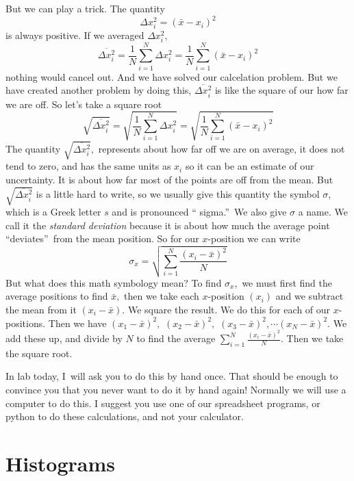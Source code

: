 \documentclass[twoside,11pt,ShortChapTitles]{BYUTextbook}
\begin{document}
But we can play a trick. The quantity
\[
\Delta x_{i}^{2}=\left( \bar{x}-x_{i}\right) ^{2}
\]%
is always positive. If we averaged $\Delta x_{i}^{2},$
\[
\overline{\Delta x_{i}^{2}}=\frac{1}{N}\sum_{i=1}^{N}\Delta x_{i}^{2}=\frac{1%
}{N}\sum_{i=1}^{N}\left( \bar{x}-x_{i}\right) ^{2}
\]%
nothing would cancel out. And we have solved our calcelation problem. But we
have created another problem by doing this, $\overline{\Delta x_{i}^{2}}$ is
like the square of our how far we are off. So let's take a square root%
\[
\sqrt{\overline{\Delta x_{i}^{2}}}=\sqrt{\frac{1}{N}\sum_{i=1}^{N}\Delta
x_{i}^{2}}=\sqrt{\frac{1}{N}\sum_{i=1}^{N}\left( \bar{x}-x_{i}\right) ^{2}}
\]%
The quantity $\sqrt{\overline{\Delta x_{i}^{2}}},$ represents about how far
off we are on average, it does not tend to zero, and has the same units as $%
x_{i}$ so it can be an estimate of our uncertainty. It is about how far most
of the points are off from the mean. But $\sqrt{\overline{\Delta x_{i}^{2}}}$
is a little hard to write, so we usually give this quantity the symbol $%
\sigma $, which is a Greek letter $s$ and is pronounced \textquotedblleft
sigma.\textquotedblright\ We also give $\sigma $ a name. We call it the
\emph{standard deviation} because it is about how much the average point
\textquotedblleft deviates\textquotedblright\ from the mean position. So for
our $x$-position we can write
\[
\sigma _{x}=\sqrt{\sum_{i=1}^{N}\frac{\left( x_{i}-\bar{x}\right) ^{2}}{N}}
\]%
But what does this math symbology mean? To find $\sigma _{x},$ we must first
find the average positions to find $\bar{x},$ then we take each $x$-position
$\left( x_{i}\right) $ and we subtract the mean from it $\left( x_{i}-\bar{x}%
\right) .$ We square the result. We do this for each of our $x$-positions.
Then we have $\left( x_{1}-\bar{x}\right) ^{2},$ $\left( x_{2}-\bar{x}%
\right) ^{2},$ $\left( x_{3}-\bar{x}\right) ^{2},\cdots \left( x_{N}-\bar{x}%
\right) ^{2}.$ We add these up, and divide by $N$ to find the average $%
\sum_{i=1}^{N}\frac{\left( x_{i}-\bar{x}\right) ^{2}}{N}.$ Then we take the
square root.

In lab today, I\ will ask you to do this by hand once. That should be enough
to convince you that you never want to do it by hand again! Normally we will
use a computer to do this. I suggest you use one of our spreadsheet
programs, or python to do these calculations, and not your calculator.

\section{Histograms}
\end{document}
